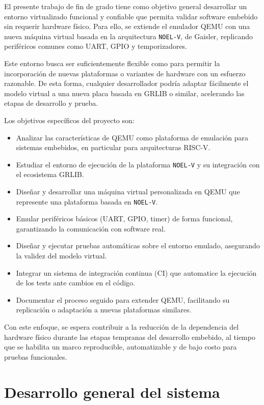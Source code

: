 El presente trabajo de fin de grado tiene como objetivo general desarrollar un entorno virtualizado funcional y confiable que permita validar software embebido sin requerir hardware físico. Para ello, se extiende el emulador QEMU con una nueva máquina virtual basada en la arquitectura \texttt{NOEL-V}, de Gaisler, replicando periféricos comunes como UART, GPIO y temporizadores.

Este entorno busca ser suficientemente flexible como para permitir la incorporación de nuevas plataformas o variantes de hardware con un esfuerzo razonable. De esta forma, cualquier desarrollador podría adaptar fácilmente el modelo virtual a una nueva placa basada en GRLIB o similar, acelerando las etapas de desarrollo y prueba.

Los objetivos específicos del proyecto son:

\begin{itemize}
    \item Analizar las características de QEMU como plataforma de emulación para sistemas embebidos, en particular para arquitecturas RISC-V.
    \item Estudiar el entorno de ejecución de la plataforma \texttt{NOEL-V} y su integración con el ecosistema GRLIB.
    \item Diseñar y desarrollar una máquina virtual personalizada en QEMU que represente una plataforma basada en \texttt{NOEL-V}.
    \item Emular periféricos básicos (UART, GPIO, timer) de forma funcional, garantizando la comunicación con software real.
    \item Diseñar y ejecutar pruebas automáticas sobre el entorno emulado, asegurando la validez del modelo virtual.
    \item Integrar un sistema de integración continua (CI) que automatice la ejecución de los tests ante cambios en el código.
    \item Documentar el proceso seguido para extender QEMU, facilitando su replicación o adaptación a nuevas plataformas similares.
\end{itemize}

Con este enfoque, se espera contribuir a la reducción de la dependencia del hardware físico durante las etapas tempranas del desarrollo embebido, al tiempo que se habilita un marco reproducible, automatizable y de bajo costo para pruebas funcionales.


\section{Desarrollo general del sistema}

